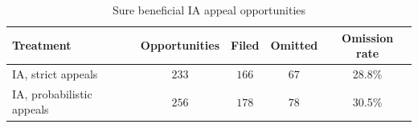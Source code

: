 \begin{table}[htbp]
\centering
\caption{Sure beneficial IA appeal opportunities}
\label{tab:missed_sure_rep}
\begin{tabular}{lcccc}
\toprule
Treatment & Opportunities & Filed & Omitted & Omission rate \\
\midrule
IA, strict appeals & \(233\) & \(166\) & \(67\) & 28.8\% \\
IA, probabilistic appeals & \(256\) & \(178\) & \(78\) & 30.5\% \\
\bottomrule
\end{tabular}
\end{table}
